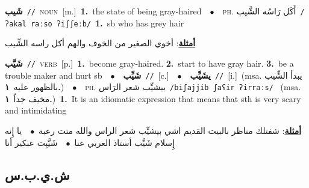 \documentclass[10pt,a4paper,twoside]{article} %
\begin{document}
\begin{multicols}{2}
{\setlength\topsep{0pt}\textbf{\foreignlanguage{arabic}{شَيب}}\ {\color{gray}\texttt{//}\color{black}}\ \textsc{noun}\ [m.]\ \textbf{1.}~the state of being gray-haired\ \ $\bullet$\ \ \textsc{ph.} \color{gray} \foreignlanguage{arabic}{أَكَل رَاسُه الشَّيب}\color{black}\ {\color{gray}\texttt{/{\sffamily ʔakal raːso ʔiʃʃeːb}/}\color{black}}\ \textbf{1.}~sb who has grey hair\  \begin{flushright}\color{gray}\foreignlanguage{arabic}{\textbf{\underline{\foreignlanguage{arabic}{أمثلة}}}: أخوي الصغير من الخوف والهم أكل راسه الشِّيب}\end{flushright}\color{black}} \vspace{2mm}

{\setlength\topsep{0pt}\textbf{\foreignlanguage{arabic}{شَيَّب}}\ {\color{gray}\texttt{//}\color{black}}\ \textsc{verb}\ [p.]\ \textbf{1.}~become gray-haired.  \textbf{2.}~start to have gray hair.  \textbf{3.}~be a trouble maker and hurt sb\ \ $\bullet$\ \ \setlength\topsep{0pt}\textbf{\foreignlanguage{arabic}{شَيِّب}}\ {\color{gray}\texttt{//}\color{black}}\ [c.]\ \ $\bullet$\ \ \setlength\topsep{0pt}\textbf{\foreignlanguage{arabic}{يشَيِّب}}\ {\color{gray}\texttt{//}\color{black}}\ [i.]\ \color{gray}(msa. \foreignlanguage{arabic}{يبدأ الشِّيب بالظهور عليه}~\foreignlanguage{arabic}{\textbf{١.}})\color{black}\ \ $\bullet$\ \ \textsc{ph.} \color{gray} \foreignlanguage{arabic}{بيشيِّب شعر الرَاس}\color{black}\ {\color{gray}\texttt{/{\sffamily biʃajjib ʃaʕir ʔirraːs}/}\color{black}}\ \color{gray} (msa. \foreignlanguage{arabic}{مخيف جداً}~\foreignlanguage{arabic}{\textbf{١.}})\color{black}\ \textbf{1.}~It is an idiomatic expression that means that sth is very scary and intimidating\  \begin{flushright}\color{gray}\foreignlanguage{arabic}{\textbf{\underline{\foreignlanguage{arabic}{أمثلة}}}: شفتلك مناظر بالبيت القديم اشي بيشيِّب شعر الراس والله متت رعبة\ $\bullet$\ \  يا إِنه إِسلام شَيَّب أستاذ العربي عنا\ $\bullet$\ \  شَيَّبِت عبكير أنا}\end{flushright}\color{black}} \vspace{2mm}

\vspace{-3mm}
\subsection*{\color{blue}\foreignlanguage{arabic}{ش.ي.ب.س}\color{blue}{ (ntws)}} 


\end{multicols}
\end{document}
